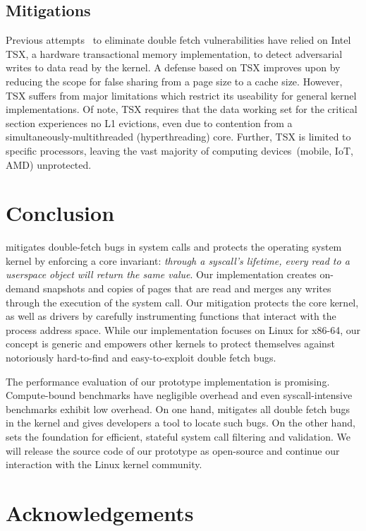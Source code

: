 \documentclass[letterpaper,twocolumn,10pt]{article}
\begin{document}
\subsection{Mitigations}

Previous attempts~\cite{schwartzDECAF,dftinker} to eliminate double fetch 
vulnerabilities have relied on Intel TSX, a hardware transactional 
memory implementation, to detect adversarial writes to data read by the 
kernel. 
A defense based on TSX improves upon \tiktok by reducing the scope for 
false sharing from a page size to a cache size. 
However, TSX suffers from major limitations which restrict its useability
for general kernel implementations. 
Of note, TSX requires that the data working set for the critical section 
experiences no L1 evictions, even due to contention from a 
simultaneously-multithreaded (hyperthreading) core.
Further, TSX is limited to specific processors, leaving the vast majority
of computing devices~(mobile, IoT, AMD) unprotected.

\section{Conclusion}

\tiktok mitigates double-fetch bugs in system calls and protects the operating
system kernel by enforcing a core invariant:  \emph{through a syscall's
lifetime, every read to a userspace object will return the same value}.
Our \tiktok implementation creates on-demand snapshots and copies of pages that
are read and merges any writes through the execution of the system call.
%
Our mitigation protects the core kernel, as well as drivers by carefully
instrumenting functions that interact with the process address space. While our
implementation focuses on Linux for x86-64, our concept is generic and empowers
other kernels to protect themselves against notoriously hard-to-find and
easy-to-exploit double fetch bugs.

The performance evaluation of our prototype implementation is promising.
Compute-bound benchmarks have negligible overhead and even syscall-intensive
benchmarks exhibit low overhead. On one hand, \tiktok mitigates all double fetch
bugs in the kernel and gives developers a tool to locate such bugs. On the other
hand, \tiktok sets the foundation for efficient, stateful system call filtering
and validation. 
%
We will release the source code of our
prototype as open-source and continue our interaction with the Linux kernel
community.

\section*{Acknowledgements}





\appendix

\end{document}
